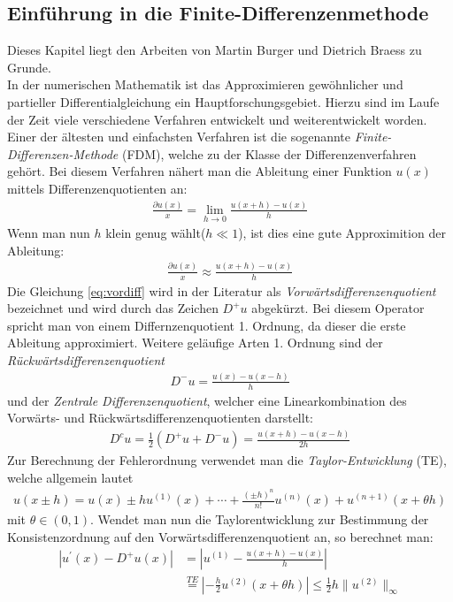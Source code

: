 \documentclass[12pt,titlepage]{article}
\begin{document}
\subsection{Einführung in die Finite-Differenzenmethode}
Dieses Kapitel liegt den Arbeiten von Martin Burger \cite{burger2006numerik} und Dietrich Braess \cite{braess2013finite} zu Grunde.\\
In der numerischen Mathematik ist das Approximieren gewöhnlicher und partieller Differentialgleichung ein Hauptforschungsgebiet. Hierzu sind im Laufe der Zeit viele verschiedene Verfahren entwickelt und weiterentwickelt worden. Einer der ältesten  und einfachsten Verfahren ist die sogenannte \textit{Finite-Differenzen-Methode} (FDM), welche zu der Klasse der Differenzenverfahren gehört. Bei diesem Verfahren nähert man die Ableitung einer Funktion $u(x)$ mittels Differenzenquotienten an:
\begin{align}
 \frac{\partial u(x)}{x}=\lim\limits_{h \rightarrow 0} \frac{u(x+h)-u(x)}{h}
\end{align}
Wenn man nun $h$ klein genug wählt($h\ll1$), ist dies eine gute Approximition der Ableitung:
\begin{align}
 \frac{\partial u(x)}{x}\approx \frac{u(x+h)-u(x)}{h}\label{eq:vordiff}
\end{align}
Die Gleichung \eqref{eq:vordiff} wird in der Literatur als \textit{Vorwärtsdifferenzenquotient} bezeichnet und wird durch das Zeichen $D^+u$ abgekürzt. Bei diesem Operator spricht man von einem Differnzenquotient 1. Ordnung, da dieser die erste Ableitung approximiert. Weitere geläufige Arten 1. Ordnung sind der \textit{Rückwärtsdifferenzenquotient}
\begin{align}
 D^-u= \frac{u(x)-u(x-h)}{h}
\end{align}
und der \textit{Zentrale Differenzenquotient}, welcher eine Linearkombination des Vorwärts- und Rückwärtsdifferenzenquotienten darstellt:
\begin{align}
 D^cu=\frac{1}{2}(D^+u+D^-u)= \frac{u(x+h)-u(x-h)}{2h}
\end{align}
Zur Berechnung der Fehlerordnung verwendet man die \textit{Taylor-Entwicklung} (TE), welche allgemein lautet
\begin{align}
 u(x\pm h)=u(x)\pm hu^{(1)}(x)+\cdots+\frac{(\pm h)^n}{n!}u^{(n)}(x)+u^{(n+1)}(x+\theta h)
\end{align}
mit $\theta\in(0,1)$. Wendet man nun die Taylorentwicklung zur Bestimmung der Konsistenzordnung auf den Vorwärtsdifferenzenquotient an, so berechnet man:
\begin{align}
 |u^{'}(x)-D^+u(x)|&=|u^{(1)}-\frac{u(x+h)-u(x)}{h}|\nonumber\\&\overset{TE}{=}|-\frac{h}{2}u^{(2)}(x+\theta h)|\le\frac{1}{2} h\|u^{(2)}\|_{\infty}
\end{align}
\end{document}
